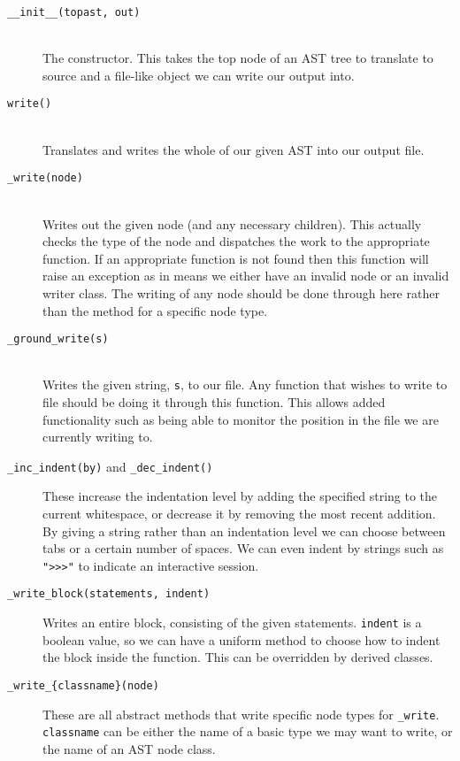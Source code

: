 \documentclass[twoside,a4paper]{report}
\begin{document}
\begin{description}
\item[\texttt{\_\_init\_\_(topast, out)}] \hfill \\
The constructor. This takes the top node of an AST tree to translate to source and a file-like object we can write our output into.

\item[\texttt{write()}] \hfill \\
Translates and writes the whole of our given AST into our output file.

\item[\texttt{\_write(node)}] \hfill \\
Writes out the given node (and any necessary children). This actually checks the type of the node and dispatches the work to the appropriate function.
If an appropriate function is not found then this function will raise an exception as in means we either have an invalid node or an invalid writer class.
The writing of any node should be done through here rather than the method for a specific node type.

\item[\texttt{\_ground\_write(s)}] \hfill \\
Writes the given string, \texttt{s}, to our file. Any function that wishes to write to file should be doing it through this function.
This allows added functionality such as being able to monitor the position in the file we are currently writing to.

\item[\texttt{\_inc\_indent(by)} and \texttt{\_dec\_indent()}]
These increase the indentation level by adding the specified string to the current whitespace, or decrease it by removing the most recent addition.
By giving a string rather than an indentation level we can choose between tabs or a certain number of spaces. We can even indent by strings such
as \texttt{">>>"} to indicate an interactive session.

\item[\texttt{\_write\_block(statements, indent)}]
Writes an entire block, consisting of the given statements. \texttt{indent} is a boolean value, so we can have a uniform method to choose how to
indent the block inside the function. This can be overridden by derived classes.

\item[\texttt{\_write\_\{classname\}(node)}]
These are all abstract methods that write specific node types for \texttt{\_write}. \texttt{classname} can be either the name of a basic type we
may want to write, or the name of an AST node class.

\end{description}
\end{document}
